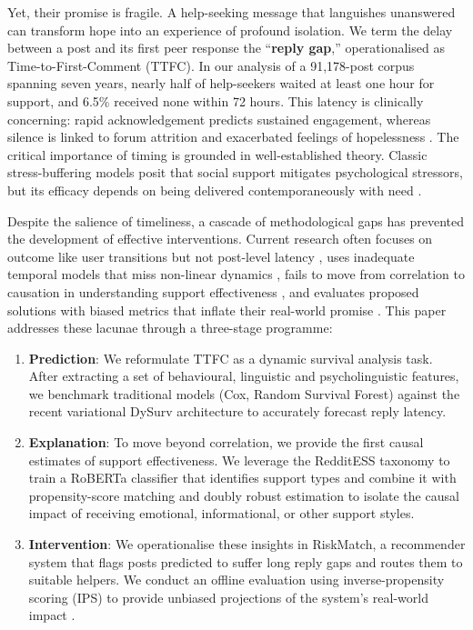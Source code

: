 \documentclass[letterpaper]{article} %
\begin{document}
Yet, their promise is fragile. A help-seeking message that languishes unanswered can transform hope into an experience of profound isolation. We term the delay between a post and its first peer response the “\textbf{reply gap},” operationalised as Time-to-First-Comment (TTFC). In our analysis of a 91,178-post corpus spanning seven years, nearly half of help-seekers waited at least one hour for support, and 6.5\% received none within 72 hours. This latency is clinically concerning: rapid acknowledgement predicts sustained engagement, whereas silence is linked to forum attrition and exacerbated feelings of hopelessness \cite{saha2020causal,kwon2023understanding,kumar2023disengagement}. The critical importance of timing is grounded in well-established theory. Classic stress-buffering models posit that social support mitigates psychological stressors, but its efficacy depends on being delivered contemporaneously with need \cite{cohen1985stress}.

Despite the salience of timeliness, a cascade of methodological gaps has prevented the development of effective interventions. Current research often focuses on outcome like user transitions but not post-level latency \cite{liu2022time}, uses inadequate temporal models that miss non-linear dynamics \cite{de2021survival}, fails to move from correlation to causation in understanding support effectiveness \cite{yuan2023mental}, and evaluates proposed solutions with biased metrics that inflate their real-world promise \cite{luo2024survey}. This paper addresses these lacunae through a three-stage programme:
\begin{enumerate}
    \item \textbf{Prediction}: We reformulate TTFC as a dynamic survival analysis task. After extracting a set of behavioural, linguistic and psycholinguistic features, we benchmark traditional models (Cox, Random Survival Forest) against the recent variational DySurv architecture \cite{mesinovic2024dysurv} to accurately forecast reply latency.
    \item \textbf{Explanation}: To move beyond correlation, we provide the first causal estimates of support effectiveness. We leverage the RedditESS taxonomy \cite{alghamdi2025redditess} to train a RoBERTa classifier that identifies support types and combine it with propensity-score matching and doubly robust estimation to isolate the causal impact of receiving emotional, informational, or other support styles.
    \item \textbf{Intervention}: We operationalise these insights in RiskMatch, a recommender system that flags posts predicted to suffer long reply gaps and routes them to suitable helpers. We conduct an offline evaluation using inverse-propensity scoring (IPS) to provide unbiased projections of the system's real-world impact \cite{li2010contextual}.
\end{enumerate}
\end{document}
